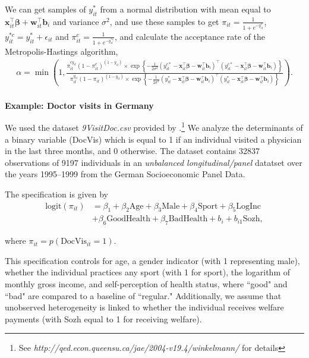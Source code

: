 We can get samples of $y_{it}^*$ from a normal distribution with mean equal to $\bm{x}_{it}^{\top}\bm{\beta}+\bm{w}_{it}^{\top}\bm{b}_i$ and variance $\sigma^2$, and use these samples to get $\pi_{it}=\frac{1}{1+e^{-y_{it}^*}}$, $y_{it}^{*c}=y_{it}^{*}+\epsilon_{it}$ and $\pi_{it}^c=\frac{1}{1+e^{-y_{it}^{*c}}}$, and calculate the acceptance rate of the Metropolis-Hastings algorithm, 
{\footnotesize
\begin{align*}
	\alpha=\min\left(1,\frac{ \pi_{it}^{cy_{it}}(1-\pi_{it}^c)^{(1-y_{it})}\times\exp\left\{-\frac{1}{2\sigma^2}(y_{it}^{c*}-\bm{x}_{it}^{\top}\bm{\beta}-\bm{w}_{it}^{\top}\bm{b}_i)^{\top}(y_{it}^{c*}-\bm{x}_{it}^{\top}\bm{\beta}-\bm{w}_{it}^{\top}\bm{b}_i)\right\}}{\pi_{it}^{y_{it}}(1-\pi_{it})^{(1-y_{it})}\times\exp\left\{-\frac{1}{2\sigma^2}(y_{it}^{*}-\bm{x}_{it}^{\top}\bm{\beta}-\bm{w}_{it}^{\top}\bm{b}_i)^{\top}(y_{it}^{*}-\bm{x}_{it}^{\top}\bm{\beta}-\bm{w}_{it}^{\top}\bm{b}_i)\right\}}\right).
\end{align*}
}\\

\textbf{Example: Doctor visits in Germany}

We used the dataset \textit{9VisitDoc.csv} provided by \cite{Winkelmann2004}.\footnote{See \textit{http://qed.econ.queensu.ca/jae/2004-v19.4/winkelmann/} for details} We analyze the determinants of a binary variable (DocVis) which is equal to 1 if an individual visited a physician in the last three months, and 0 otherwise.
The dataset contains 32837 observations of 9197 individuals in an \textit{unbalanced longitudinal/panel} datatset over the years 1995--1999 from the German Socioeconomic Panel Data.

The specification is given by 
\begin{align*}
	\text{logit}(\pi_{it})&=\beta_1+\beta_2\text{Age}+\beta_3\text{Male}+\beta_4\text{Sport}+\beta_5\text{LogInc}\\
	&+\beta_6 \text{GoodHealth} + \beta_7\text{BadHealth} + b_i + b_{i1}\text{Sozh},
\end{align*}

where $\pi_{it}=p(\text{DocVis}_{it}=1)$.

This specification controls for age, a gender indicator (with 1 representing male), whether the individual practices any sport (with 1 for sport), the logarithm of monthly gross income, and self-perception of health status, where ``good" and ``bad" are compared to a baseline of ``regular." Additionally, we assume that unobserved heterogeneity is linked to whether the individual receives welfare payments (with Sozh equal to 1 for receiving welfare). 

